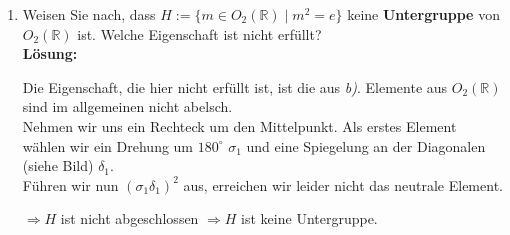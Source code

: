 \documentclass[11pt,a4paper,ngerman]{article}
\newcommand{\R}{\mathbb{R}}
\begin{document}
\begin{enumerate}[\bfseries a)]
\item Weisen Sie nach, dass $H := \{ m \in O_2 (\R ) \; | \; m^2 = e \}$ keine \textbf{Untergruppe} von $O_2 (\R ) $ ist. Welche Eigenschaft ist nicht erfüllt?\\

\textbf{Lösung:}

Die Eigenschaft, die hier nicht erfüllt ist, ist die aus \emph{b)}. Elemente aus $O_2 (\R)$ sind im allgemeinen nicht abelsch.\\
Nehmen wir uns ein Rechteck um den Mittelpunkt. Als erstes Element wählen wir ein Drehung um $180^\circ$ $\sigma_1$ und eine Spiegelung an der Diagonalen (siehe Bild) $\delta_1$.\\

Führen wir nun $(\sigma_1 \delta_1)^2$ aus, erreichen wir leider nicht das neutrale Element.\\

\vspace{200px}

$\Rightarrow H$ ist nicht abgeschlossen $\Rightarrow H$ ist keine Untergruppe. 

\end{enumerate}

\label{LastPage}
\end{document}
